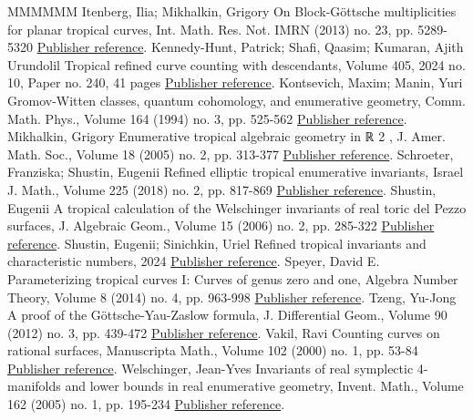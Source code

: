 \documentclass[11pt]{article}
\theoremstyle{definition}
\numberwithin{equation}{section}
\theoremstyle{plain}
\begin{document}
\begin{thebibliography}{MMMMMM}
 Itenberg, Ilia; Mikhalkin, Grigory On Block-Göttsche multiplicities for planar tropical curves, Int. Math. Res. Not. IMRN (2013) no. 23, pp. 5289-5320 \href{https://alco.centre-mersenne.org/articles/10.5802/alco.444/#itenberg_block-gottsche_2013}{Publisher reference}.
 Kennedy-Hunt, Patrick; Shafi, Qaasim; Kumaran, Ajith Urundolil Tropical refined curve counting with descendants, Volume 405, 2024 no. 10, Paper no. 240, 41 pages \href{https://alco.centre-mersenne.org/articles/10.5802/alco.444/#kennedyhunt-2024-tropical}{Publisher reference}.
 Kontsevich, Maxim; Manin, Yuri Gromov-Witten classes, quantum cohomology, and enumerative geometry, Comm. Math. Phys., Volume 164 (1994) no. 3, pp. 525-562 \href{https://alco.centre-mersenne.org/articles/10.5802/alco.444/#kontsevich_gromov-witten_1994}{Publisher reference}.
 Mikhalkin, Grigory Enumerative tropical algebraic geometry in ℝ 2 , J. Amer. Math. Soc., Volume 18 (2005) no. 2, pp. 313-377 \href{https://alco.centre-mersenne.org/articles/10.5802/alco.444/#mikhalkin_enumerative_2005}{Publisher reference}.
 Schroeter, Franziska; Shustin, Eugenii Refined elliptic tropical enumerative invariants, Israel J. Math., Volume 225 (2018) no. 2, pp. 817-869 \href{https://alco.centre-mersenne.org/articles/10.5802/alco.444/#schroeter-2018-refined}{Publisher reference}.
 Shustin, Eugenii A tropical calculation of the Welschinger invariants of real toric del Pezzo surfaces, J. Algebraic Geom., Volume 15 (2006) no. 2, pp. 285-322 \href{https://alco.centre-mersenne.org/articles/10.5802/alco.444/#shustin-2006-tropical}{Publisher reference}.
 Shustin, Eugenii; Sinichkin, Uriel Refined tropical invariants and characteristic numbers, 2024 \href{https://alco.centre-mersenne.org/articles/10.5802/alco.444/#shustin-2024-refined}{Publisher reference}.
 Speyer, David E. Parameterizing tropical curves I: Curves of genus zero and one, Algebra Number Theory, Volume 8 (2014) no. 4, pp. 963-998 \href{https://alco.centre-mersenne.org/articles/10.5802/alco.444/#speyer-2014-parametrizing}{Publisher reference}.
 Tzeng, Yu-Jong A proof of the Göttsche-Yau-Zaslow formula, J. Differential Geom., Volume 90 (2012) no. 3, pp. 439-472 \href{https://alco.centre-mersenne.org/articles/10.5802/alco.444/#tzeng_proof_2012}{Publisher reference}.
 Vakil, Ravi Counting curves on rational surfaces, Manuscripta Math., Volume 102 (2000) no. 1, pp. 53-84 \href{https://alco.centre-mersenne.org/articles/10.5802/alco.444/#vakil-2000-counting}{Publisher reference}.
 Welschinger, Jean-Yves Invariants of real symplectic 4-manifolds and lower bounds in real enumerative geometry, Invent. Math., Volume 162 (2005) no. 1, pp. 195-234 \href{https://alco.centre-mersenne.org/articles/10.5802/alco.444/#welschinger_invariants_2005}{Publisher reference}.
\end{thebibliography}
\end{document}
